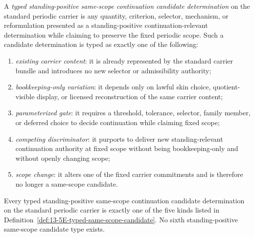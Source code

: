 \begin{manualdefinition}
\label{def:13-5E-typed-same-scope-candidate}
A \emph{typed standing-positive same-scope continuation candidate determination} on the standard periodic carrier is any quantity,
criterion, selector, mechanism, or reformulation presented as a standing-positive continuation-relevant determination while claiming to
preserve the fixed periodic scope. Such a candidate determination is typed as exactly one of the following:
\begin{enumerate}[label=(\roman*), leftmargin=2.2em]
\item \emph{existing carrier content}: it is already represented by the standard carrier bundle and introduces no new selector or admissibility authority;
\item \emph{bookkeeping-only variation}: it depends only on lawful skin choice, quotient-visible display, or licensed reconstruction of the same carrier content;
\item \emph{parameterized gate}: it requires a threshold, tolerance, selector, family member, or deferred choice to decide continuation while claiming fixed scope;
\item \emph{competing discriminator}: it purports to deliver new standing-relevant continuation authority at fixed scope without being bookkeeping-only and without openly changing scope;
\item \emph{scope change}: it alters one of the fixed carrier commitments and is therefore no longer a same-scope candidate.
\end{enumerate}
\end{manualdefinition}

\begin{manualtheorem}
\label{thm:13-5F-finite-same-scope-classification}
Every typed standing-positive same-scope continuation candidate determination on the standard periodic carrier is exactly one of the
five kinds listed in Definition~\ref{def:13-5E-typed-same-scope-candidate}. No sixth standing-positive same-scope
candidate type exists.
\end{manualtheorem}

